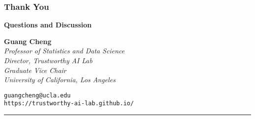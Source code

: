 \documentclass{beamer}
\begin{document}

\begin{frame}
    \frametitle{Thank You}
    \begin{center}
        \Large \textcolor{MyBlue}{\textbf{Questions and Discussion}}
        
        \vspace{1cm}
        
        \textbf{Guang Cheng}\\
        \textit{Professor of Statistics and Data Science}\\
        \textit{Director, Trustworthy AI Lab}\\
        \textit{Graduate Vice Chair}\\
        \textit{University of California, Los Angeles}
        
        \vspace{0.5cm}
        
        \texttt{guangcheng@ucla.edu}\\
        \texttt{https://trustworthy-ai-lab.github.io/}
        
        \vspace{1cm}
        
        \textcolor{MyBlue}{\rule{3cm}{2cm}}
    \end{center}
\end{frame}
\end{document}
